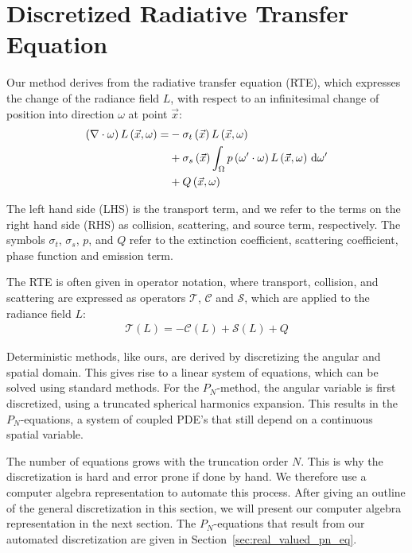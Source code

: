 \section{Discretized Radiative Transfer Equation}
\label{sec:discretized_rte}

Our method derives from the radiative transfer equation (RTE), which expresses the change of the radiance field $L$, with respect to an infinitesimal change of position into direction $\omega$ at point $\vec{x}$:
\begin{align}
\left(\nabla\cdot\omega\right)L\left(\vec{x}, \omega \right)
=&
-\sigma_t\left(\vec{x}\right) L\left(\vec{x}, \omega \right)\nonumber\\
&
+\sigma_s\left(\vec{x}\right) \int_{\Omega}
{
p\left(\omega'\cdot\omega\right)L\left(\vec{x}, \omega \right)\,\mathrm{d}\omega'
}\nonumber\\
&
+Q\left(\vec{x}, \omega\right)\nonumber
\label{eq:rte}
\end{align}

The left hand side (LHS) is the transport term, and we refer to the terms on the right hand side (RHS) as collision, scattering, and source term, respectively. The symbols $\sigma_t$, $\sigma_s$, $p$, and $Q$ refer to the extinction coefficient, scattering coefficient, phase function and emission term.

The RTE is often given in operator notation, where transport, collision, and scattering are expressed as operators $\mathcal{T}$, $\mathcal{C}$ and $\mathcal{S}$, which are applied to the radiance field $L$:
\begin{align}
\mathcal{T}\left(L\right) = -\mathcal{C}\left(L\right) + \mathcal{S}\left(L\right) + Q
\end{align}

Deterministic methods, like ours, are derived by discretizing the angular and spatial domain. This gives rise to a linear system of equations, which can be solved using standard methods. For the $P_N$-method, the angular variable is first discretized, using a truncated spherical harmonics expansion. This results in the $P_N$-equations, a system of coupled PDE's that still depend on a continuous spatial variable.

The number of equations grows with the truncation order $N$. This is why the discretization is hard and error prone if done by hand. We therefore use a computer algebra representation to automate this process. After giving an outline of the general discretization in this section, we will present our computer algebra representation in the next section. The $P_N$-equations that result from our automated discretization are given in Section~\ref{sec:real_valued_pn_eq}. 

